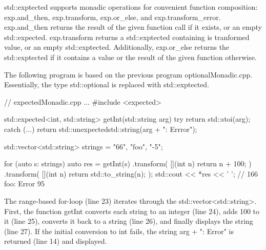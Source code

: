 std::exptected supports monadic operations for convenient function composition: exp.and\_then, exp.transform, exp.or\_else, and exp.transform\_error. exp.and\_then returns the result of the given function call if it exists, or an empty std::expected. exp.transform returns a std::exptected containing is tranformed value, or an empty std::exptected. Additionally, exp.or\_else returns the std::exptected if it contains a value or the result of the given function otherwise.

The following program is based on the previous program optionalMonadic.cpp. Essentially, the type std::optional is replaced with std::exptected.


\begin{cpp}
// expectedMonadic.cpp
...
#include <expected>

std::expected<int, std::string> getInt(std::string arg) {
	try {
		return std::stoi(arg);
	}
	catch (...) {
		return std::unexpected{std::string(arg + ": Errror")};
	}
}

std::vector<std::string> strings = {"66", "foo", "-5"};

for (auto s: strings) {
	auto res = getInt(s)
				.transform( [](int n) { return n + 100; })
				.transform( [](int n) { return std::to_string(n); });
	std::cout << *res << ' '; // 166 foo: Error 95
}
\end{cpp}

The range-based for-loop (line 23) iterates through the std::vector<std::string>. First, the function getInt converts each string to an integer (line 24), adds 100 to it (line 25), converts it back to a string (line 26), and finally displays the string (line 27). If the initial conversion to int fails, the string arg + ": Error" is returned (line 14) and displayed.







































